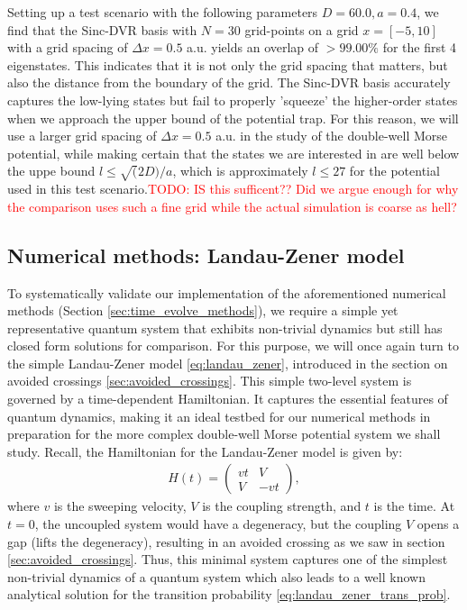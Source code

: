 \documentclass{subfiles}
\begin{document}
Setting up a test scenario with the following parameters $D = 60.0, a = 0.4$, we find that the Sinc-DVR basis with $N=30$ grid-points on a grid $x = [-5, 10]$ with a grid spacing of $\Delta x = 0.5$ a.u. yields an overlap of $>99.00\%$ for the first 4 eigenstates. This indicates that it is not only the grid spacing that matters, but also the distance from the boundary of the grid. The Sinc-DVR basis accurately captures the low-lying states but fail to properly 'squeeze' the higher-order states when we approach the upper bound of the potential trap. For this reason, we will use a larger grid spacing of $\Delta x = 0.5$ a.u. in the study of the double-well Morse potential, while making certain that the states we are interested in are well below the uppe bound $l \leq \sqrt(2D)/a$, which is approximately $l \leq 27$ for the potential used in this test scenario.\textcolor{red}{TODO: IS this sufficent?? Did we argue enough for why the comparison uses such a fine grid while the actual simulation is coarse as hell?}

\subsection{Numerical methods: Landau-Zener model}
To systematically validate our implementation of the aforementioned numerical methods (Section \ref{sec:time_evolve_methods}), we require a simple yet representative quantum system that exhibits non-trivial dynamics but still has closed form solutions for comparison. For this purpose, we will once again turn to the simple Landau-Zener model \eqref{eq:landau_zener}, introduced in the section on avoided crossings \ref{sec:avoided_crossings}. This simple two-level system is governed by a time-dependent Hamiltonian. It captures the essential features of quantum dynamics, making it an ideal testbed for our numerical methods in preparation for the more complex double-well Morse potential system we shall study.
Recall, the Hamiltonian for the Landau-Zener model is given by:
\begin{align*}
    H(t) = \begin{pmatrix}
        vt & V \\
        V & -vt
\end{pmatrix},
\end{align*}
where $v$ is the sweeping velocity, $V$ is the coupling strength, and $t$ is the time. At $t=0$, the uncoupled system would have a degeneracy, but the coupling $V$ opens a gap (lifts the degeneracy), resulting in an avoided crossing as we saw in section \ref{sec:avoided_crossings}. Thus, this minimal system captures one of the simplest non-trivial dynamics of a quantum system which also leads to a well known analytical solution for the transition probability \eqref{eq:landau_zener_trans_prob}. 
\end{document}
